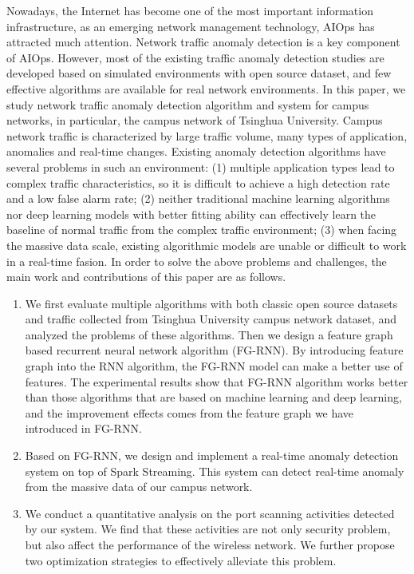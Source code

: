 \begin{abstract*}
  Nowadays, the Internet has become one of the most important information infrastructure, as an emerging network management technology, AIOps has attracted much attention. Network traffic anomaly detection is a key component of AIOps. However, most of the existing traffic anomaly detection studies are developed based on simulated environments with open source dataset, and few effective algorithms are available for real network environments. In this paper, we study network traffic anomaly detection algorithm and system for campus networks, in particular, the campus network of Tsinghua University. Campus network traffic is characterized by large traffic volume, many types of application, anomalies and real-time changes. Existing anomaly detection algorithms have several problems in such an environment: (1) multiple application types lead to complex traffic characteristics, so it is difficult to achieve a high detection rate and a low false alarm rate; (2) neither traditional machine learning algorithms nor deep learning models with better fitting ability can effectively learn the baseline of normal traffic from the complex traffic environment; (3) when facing the massive data scale, existing algorithmic models are unable or difficult to work in a real-time fasion. In order to solve the above problems and challenges, the main work and contributions of this paper are as follows.

  \begin{enumerate}
    \item We first evaluate multiple algorithms with both  classic open source datasets and traffic collected from Tsinghua University campus network dataset, and analyzed the problems of these algorithms. Then we design a feature graph based recurrent neural network algorithm (FG-RNN). By introducing feature graph into the RNN algorithm, the FG-RNN model can make a better use of features. The experimental results show that FG-RNN algorithm works better than those algorithms that are based on machine learning and deep learning, and the improvement effects comes from the feature graph we have introduced in FG-RNN.
    \item Based on FG-RNN, we design and implement a real-time anomaly detection system on top of Spark Streaming. This system can detect real-time anomaly from the massive data of our campus network.
    \item We conduct a quantitative analysis on the port scanning activities detected by our system. We find that these activities are not only security problem, but also affect the performance of the wireless network. We further propose two optimization strategies to effectively alleviate this problem.
  \end{enumerate}



\end{abstract*}
